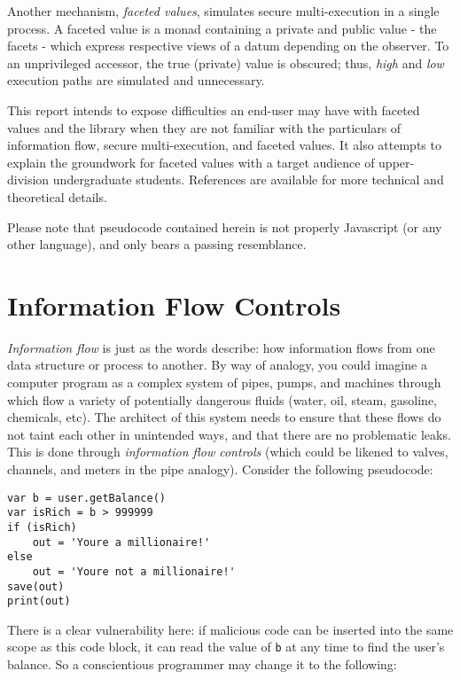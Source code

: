 \documentclass[12pt,a4paper]{article}
\begin{document}
		Another mechanism, \textit{faceted values}\cite{AustinFlanagan2012}, simulates secure multi-execution in a single process. A faceted value is a monad containing a private and public value - the facets - which express respective views of a datum depending on the observer. To an unprivileged accessor, the true (private) value is obscured; thus, \textit{high} and \textit{low} execution paths are simulated and unnecessary. 
		
		This report intends to expose difficulties an end-user may have with faceted values and the library when they are not familiar with the particulars of information flow, secure multi-execution, and faceted values. It also attempts to explain the groundwork for faceted values with a target audience of upper-division undergraduate students. References are available for more technical and theoretical details.
		
		Please note that pseudocode contained herein is not properly Javascript (or any other language), and only bears a passing resemblance.
	
	\section{Information Flow Controls}
		\textit{Information flow}\cite{DenningDenning1977} is just as the words describe: how information flows from one data structure or process to another. By way of analogy, you could imagine a computer program as a complex system of pipes, pumps, and machines through which flow a variety of potentially dangerous fluids (water, oil, steam, gasoline, chemicals, etc). The architect of this system needs to ensure that these flows do not taint each other in unintended ways, and that there are no problematic leaks. This is done through \textit{information flow controls} (which could be likened to valves, channels, and meters in the pipe analogy). Consider the following pseudocode:
		
		\lstset{language=PHP}
		\begin{lstlisting}
var b = user.getBalance()
var isRich = b > 999999
if (isRich)
	out = 'Youre a millionaire!'
else
	out = 'Youre not a millionaire!'
save(out)
print(out)
		\end{lstlisting}
		
		There is a clear vulnerability here: if malicious code can be inserted into the same scope as this code block, it can read the value of \lstinline{b} at any time to find the user's balance. So a conscientious programmer may change it to the following:
		
\end{document}
